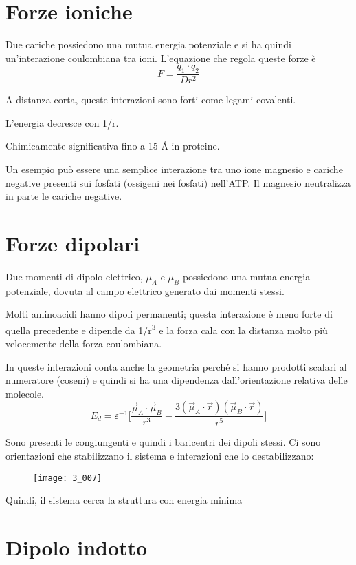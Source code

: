 \section{Forze ioniche}

Due cariche possiedono una mutua energia potenziale e si ha quindi
un'interazione coulombiana tra ioni.
L'equazione che regola queste forze è
\[
  F = \frac{q_1 \cdot q_2}{Dr^2}
\]


A distanza corta, queste interazioni sono forti come legami covalenti.

L'energia decresce con 1/r.

Chimicamente significativa fino a 15 \AA{} in proteine.

Un esempio può essere una semplice interazione tra uno ione magnesio e cariche negative presenti sui fosfati (ossigeni nei fosfati) nell'ATP. Il magnesio neutralizza in parte le cariche negative.

\section{Forze dipolari}

Due momenti di dipolo elettrico, $\mu_A$ e $\mu_B$
possiedono una mutua energia potenziale, dovuta al campo elettrico
generato dai momenti stessi.


Molti aminoacidi hanno dipoli permanenti; questa interazione è meno
forte di quella precedente e dipende da 1/r\textsuperscript{3} e la
forza cala con la distanza molto più velocemente della forza
coulombiana.

In queste interazioni conta anche la geometria perché si hanno prodotti
scalari al numeratore (coseni) e quindi si ha una dipendenza
dall'orientazione relativa delle molecole.
\[
E_d = \varepsilon^{-1} \biggl[\frac{\vec{\mu}_A \cdot \vec{\mu}_B}{r^3} - \frac{3(\vec{\mu}_A \cdot \vec{r})(\vec{\mu}_B \cdot \vec{r})}{r^5} \biggr]
\]

Sono presenti le congiungenti e quindi i baricentri dei dipoli stessi. Ci sono orientazioni che stabilizzano il sistema e interazioni che lo
destabilizzano:

\begin{figure}[H]
  \texttt{[image: 3\_007]}
\end{figure}

Quindi, il sistema cerca la struttura con energia minima

\section{Dipolo indotto}

